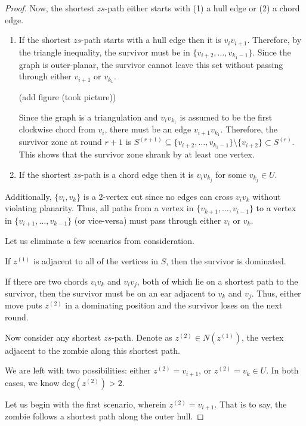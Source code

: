 \documentclass[letterpaper, 10pt]{article}
\begin{document}
\begin{proof}
Now, the shortest $zs$-path either starts with (1) a hull edge or (2) a chord edge.
\begin{enumerate}
  \item If the shortest $zs$-path starts with a hull edge then it is $v_iv_{i+1}$.
  Therefore, by the triangle inequality, the survivor must be in $\{v_{i+2}, \dots, v_{k_1 -1 }\}$.
  Since the graph is outer-planar, the survivor cannot leave this set without passing through
  either $v_{i+1}$ or $v_{k_1}$.

  (add figure (took picture))

  Since the graph is a triangulation and $v_iv_{k_1}$ is assumed to be the first clockwise chord from $v_i$,
  there must be an edge $v_{i+1}v_{k_1}$.
  Therefore, the survivor zone at round $r+1$ is
  $S^{(r+1)} \subseteq \{v_{i+2}, \dots, v_{k_1 -1 }\} \setminus \{v_{i+2}\} \subset S^{(r)}$.
  This shows that the survivor zone shrank by at least one vertex.

  \item If the shortest $zs$-path is a chord edge then it is $v_iv_{k_j}$ for some
    $v_{k_j} \in U$.

\end{enumerate}
Additionally, $\{v_i, v_k\}$ is a 2-vertex cut since no edges can cross $v_iv_k$ without
violating planarity. Thus, all paths from a vertex in $\{v_{k+1}, \dots, v_{i-1}\}$ to
a vertex in $\{v_{i+1}, \dots, v_{k-1}\}$ (or vice-versa) must pass through either $v_i$ or $v_k$.


Let us eliminate a few scenarios from consideration.

If $z^{(1)}$ is adjacent to all of the vertices in $S$, then the survivor is dominated.

If there are two chords $v_iv_k$ and $v_iv_j$, both of which lie on a shortest path to the survivor,
then the survivor must be on an ear adjacent to $v_k$ and $v_j$. Thus, either move puts $z^{(2)}$ in
a dominating position and the survivor loses on the next round.



Now consider any shortest $zs$-path. Denote as $z^{(2)} \in N(z^{(1)})$,
the vertex adjacent to the zombie along this shortest path.


We are left with two possibilities: either $z^{(2)} = v_{i+1}$, or $z^{(2)} = v_k \in U$.
In both cases, we know $\text{deg}(z^{(2)}) > 2$.

Let us begin with the first scenario, wherein $z^{(2)} = v_{i+1}$. That is to say,
the zombie follows a shortest path along the outer hull.


\end{proof}
\end{document}
